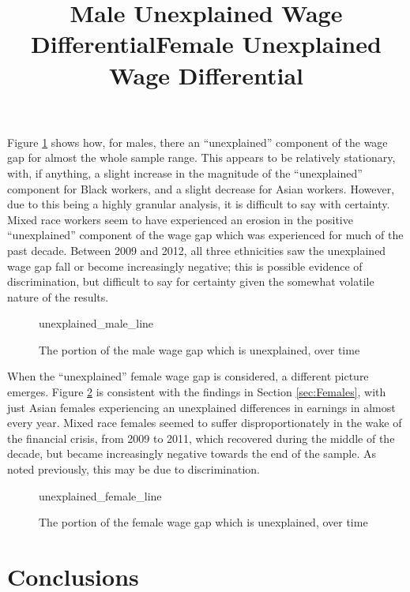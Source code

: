 \documentclass[class=article, crop=false]{standalone}
\begin{document}
Figure \ref{fig:unexplained_male_line} shows how, for males, there an \enquote{unexplained} component of the wage gap for almost the whole sample range. This appears to be relatively stationary, with, if anything, a slight increase in the magnitude of the \enquote{unexplained} component for Black workers, and a slight decrease for Asian workers. However, due to this being a highly granular analysis, it is difficult to say with certainty. Mixed race workers seem to have experienced an erosion in the positive \enquote{unexplained} component of the wage gap which was experienced for much of the past decade. Between 2009 and 2012, all three ethnicities saw the unexplained wage gap fall or become increasingly negative; this is possible evidence of discrimination, but difficult to say for certainty given the somewhat volatile nature of the results.

\begin{figure}[h]
\centering
    \title{Male Unexplained Wage Differential}
    {unexplained_male_line}
    \caption{The portion of the male wage gap which is unexplained, over time}
    \label{fig:unexplained_male_line}
\end{figure}

When the \enquote{unexplained} female wage gap is considered, a different picture emerges. Figure \ref{fig:unexplained_female_line} is consistent with the findings in Section \ref{sec:Females}, with just Asian females experiencing an unexplained differences in earnings in almost every year. Mixed race females seemed to suffer disproportionately in the wake of the financial crisis, from 2009 to 2011, which recovered during the middle of the decade, but became increasingly negative towards the end of the sample. As noted previously, this may be due to discrimination.
\begin{figure}[h]
\centering
    \title{Female Unexplained Wage Differential}
    {unexplained_female_line}
    \caption{The portion of the female wage gap which is unexplained, over time}
    \label{fig:unexplained_female_line}
\end{figure}

\section{Conclusions}
\label{sec:conclusions}
\end{document}
